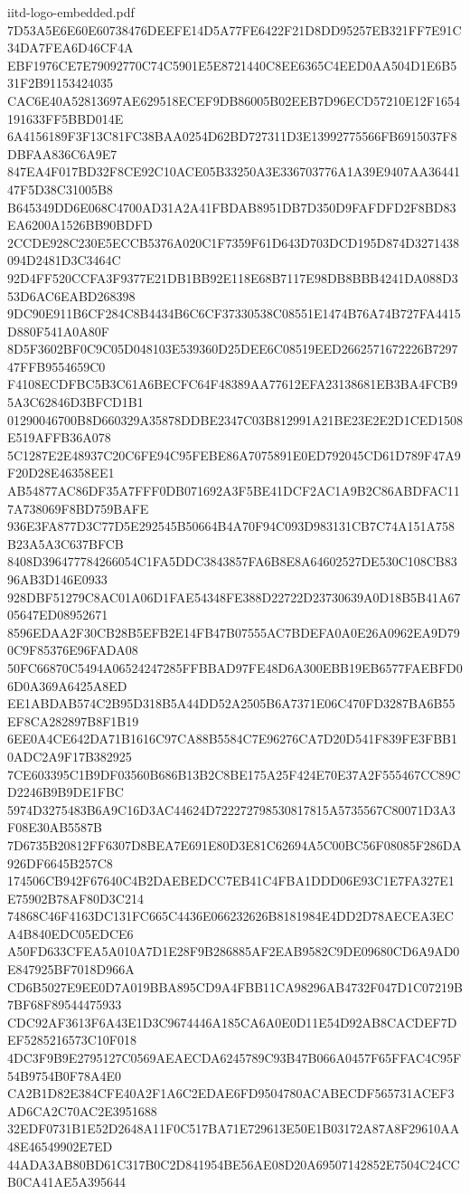 \begin{filecontents*}[overwrite]{iitd-logo-embedded.pdf}
7D53A5E6E60E60738476DEEFE14D5A77FE6422F21D8DD95257EB321FF7E91C34DA7FEA6D46CF4A
EBF1976CE7E79092770C74C5901E5E8721440C8EE6365C4EED0AA504D1E6B531F2B91153424035
CAC6E40A52813697AE629518ECEF9DB86005B02EEB7D96ECD57210E12F1654191633FF5BBD014E
6A4156189F3F13C81FC38BAA0254D62BD727311D3E13992775566FB6915037F8DBFAA836C6A9E7
847EA4F017BD32F8CE92C10ACE05B33250A3E336703776A1A39E9407AA3644147F5D38C31005B8
B645349DD6E068C4700AD31A2A41FBDAB8951DB7D350D9FAFDFD2F8BD83EA6200A1526BB90BDFD
2CCDE928C230E5ECCB5376A020C1F7359F61D643D703DCD195D874D3271438094D2481D3C3464C
92D4FF520CCFA3F9377E21DB1BB92E118E68B7117E98DB8BBB4241DA088D353D6AC6EABD268398
9DC90E911B6CF284C8B4434B6C6CF37330538C08551E1474B76A74B727FA4415D880F541A0A80F
8D5F3602BF0C9C05D048103E539360D25DEE6C08519EED2662571672226B729747FFB9554659C0
F4108ECDFBC5B3C61A6BECFC64F48389AA77612EFA23138681EB3BA4FCB95A3C62846D3BFCD1B1
01290046700B8D660329A35878DDBE2347C03B812991A21BE23E2E2D1CED1508E519AFFB36A078
5C1287E2E48937C20C6FE94C95FEBE86A7075891E0ED792045CD61D789F47A9F20D28E46358EE1
AB54877AC86DF35A7FFF0DB071692A3F5BE41DCF2AC1A9B2C86ABDFAC117A738069F8BD759BAFE
936E3FA877D3C77D5E292545B50664B4A70F94C093D983131CB7C74A151A758B23A5A3C637BFCB
8408D396477784266054C1FA5DDC3843857FA6B8E8A64602527DE530C108CB8396AB3D146E0933
928DBF51279C8AC01A06D1FAE54348FE388D22722D23730639A0D18B5B41A6705647ED08952671
8596EDAA2F30CB28B5EFB2E14FB47B07555AC7BDEFA0A0E26A0962EA9D790C9F85376E96FADA08
50FC66870C5494A06524247285FFBBAD97FE48D6A300EBB19EB6577FAEBFD06D0A369A6425A8ED
EE1ABDAB574C2B95D318B5A44DD52A2505B6A7371E06C470FD3287BA6B55EF8CA282897B8F1B19
6EE0A4CE642DA71B1616C97CA88B5584C7E96276CA7D20D541F839FE3FBB10ADC2A9F17B382925
7CE603395C1B9DF03560B686B13B2C8BE175A25F424E70E37A2F555467CC89CD2246B9B9DE1FBC
5974D3275483B6A9C16D3AC44624D722272798530817815A5735567C80071D3A3F08E30AB5587B
7D6735B20812FF6307D8BEA7E691E80D3E81C62694A5C00BC56F08085F286DA926DF6645B257C8
174506CB942F67640C4B2DAEBEDCC7EB41C4FBA1DDD06E93C1E7FA327E1E75902B78AF80D3C214
74868C46F4163DC131FC665C4436E066232626B8181984E4DD2D78AECEA3ECA4B840EDC05EDCE6
A50FD633CFEA5A010A7D1E28F9B286885AF2EAB9582C9DE09680CD6A9AD0E847925BF7018D966A
CD6B5027E9EE0D7A019BBA895CD9A4FBB11CA98296AB4732F047D1C07219B7BF68F89544475933
CDC92AF3613F6A43E1D3C9674446A185CA6A0E0D11E54D92AB8CACDEF7DEF5285216573C10F018
4DC3F9B9E2795127C0569AEAECDA6245789C93B47B066A0457F65FFAC4C95F54B9754B0F78A4E0
CA2B1D82E384CFE40A2F1A6C2EDAE6FD9504780ACABECDF565731ACEF3AD6CA2C70AC2E3951688
32EDF0731B1E52D2648A11F0C517BA71E729613E50E1B03172A87A8F29610AA48E46549902E7ED
44ADA3AB80BD61C317B0C2D841954BE56AE08D20A69507142852E7504C24CCB0CA41AE5A395644

\end{filecontents*}
